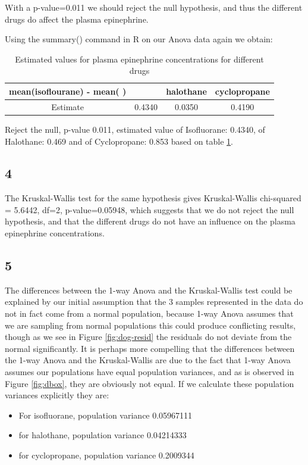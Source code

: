 \documentclass{article}
\begin{document}
    With a p-value=0.011 we should reject the null hypothesis, and thus the different drugs do affect the plasma epinephrine.
    
    Using the summary() command in R on our Anova data again we obtain:
    
    \begin{table}[H]
    \begin{center}
    \begin{tabular}{c|c|c|c|}
        \hline 
        mean(isoflourane) - mean( )&  & halothane  & cyclopropane \\
        \hline
        Estimate & 0.4340 & 0.0350 & 0.4190\\
        \hline
    \end{tabular}
    \caption{Estimated values for plasma epinephrine concentrations for different drugs}
    \label{table:doganova}
    \end{center}
    \end{table}
    
    Reject the null, p-value 0.011, estimated value of Isofluorane: 0.4340, of Halothane: 0.469 and of Cyclopropane: 0.853 based on table \ref{table:doganova}.
    
    \subsection*{4}
    
    The Kruskal-Wallis test for the same hypothesis gives Kruskal-Wallis chi-squared = 5.6442, df=2, p-value=0.05948, which suggests that we do not reject the null hypothesis, and that the different drugs do not have an influence on the plasma epinephrine concentrations.
     
    \subsection*{5}
    The differences between the 1-way Anova and the Kruskal-Wallis test could be explained by our initial assumption that the 3 samples represented in the data do not in fact come from a normal population, because 1-way Anova assumes that we are sampling from normal populations this could produce conflicting results, though as we see in Figure \ref{fig:dog-resid} the residuals do not deviate from the normal significantly.
    It is perhaps more compelling that the differences between the 1-way Anova and the Kruskal-Wallis are due to the fact that 1-way Anova assumes our populations have equal population variances, and as is observed in Figure \ref{fig:dbox}, they are obviously not equal. If we calculate these population variances explicitly they are:
    \begin{itemize}
    \item For isofluorane, population variance 0.05967111
    \item for halothane, population variance 0.04214333
    \item for cyclopropane, population variance 0.2009344 
    \end{itemize}
    
\end{document}
